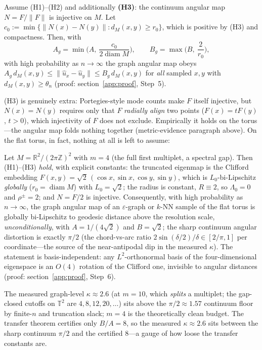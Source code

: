 \documentclass[review]{siamart220329}
\begin{document}
\begin{corollary}\label{cor:global}
Assume (H1)--(H2) and additionally \textbf{(H3)}: the continuum angular
map $N=F/\lVert F\rVert$ is injective on $M$. Let
$c_0:=\min\{\lVert N(x)-N(y)\rVert : d_M(x,y)\ge r_0\}$, which is positive by
(H3) and compactness. Then, with
\[
A_g=\min\Big(A,\ \frac{c_0}{2\operatorname{diam}M}\Big),\qquad
B_g=\max\Big(B,\ \frac{2}{r_0}\Big),
\]
with high probability as $n\to\infty$ the graph angular map obeys
$A_g\,d_M(x,y)\le\lVert\hat u_x-\hat u_y\rVert\le B_g\,d_M(x,y)$ for
\emph{all} sampled $x,y$ with $d_M(x,y)\ge\theta_n$
(proof: section~\ref{app:proof}, Step~5).
\end{corollary}

(H3) is genuinely extra: Portegies-style mode counts \cite{portegies2016}
make $F$ itself injective, but $N(x)=N(y)$ requires only that $F$ \emph{radially
align} two points ($F(x)=tF(y)$, $t>0$), which injectivity of $F$ does not
exclude. Empirically it holds on the torus---the angular map folds nothing
together (metric-evidence paragraph above). On the flat torus, in fact, nothing
at all is left to assume:

\begin{corollary}\label{cor:torus}
Let $M=\mathbb{R}^2/(2\pi\mathbb{Z})^2$ with $m=4$ (the full first
multiplet, a spectral gap). Then (H1)--(H3) \emph{hold}, with explicit
constants: the truncated eigenmap is the Clifford embedding
$F(x,y)=\sqrt2\,(\cos x,\sin x,\cos y,\sin y)$, which is $L_0$-bi-Lipschitz
\emph{globally} ($r_0=\operatorname{diam}M$) with $L_0=\sqrt2$; the radius is
constant, $R\equiv2$, so $\Lambda_0=0$ and $\rho^\pm=2$; and $N=F/2$ is
injective. Consequently, with high probability as $n\to\infty$, the graph
angular map of an $\varepsilon$-graph or $k$-NN sample of the flat torus is
globally bi-Lipschitz to geodesic distance above the resolution scale,
\emph{unconditionally}, with $A=1/(4\sqrt2)$ and $B=\sqrt2$; the sharp
continuum angular distortion is exactly $\pi/2$ (the chord-vs-arc ratio
$2\sin(\delta/2)/\delta\in[2/\pi,1]$ per coordinate---the source of the
near-antipodal dip in the measured $\kappa$). The statement is basis-independent: any
$L^2$-orthonormal basis of the four-dimensional eigenspace is an $O(4)$
rotation of the Clifford one, invisible to angular distances (proof:
section~\ref{app:proof}, Step~6).
\end{corollary}

The measured graph-level $\kappa\approx2.6$ (at $m{=}10$, which \emph{splits} a
multiplet; the gap-closed cutoffs on $\mathbb T^2$ are $4,8,12,20,\dots$) sits
above the $\pi/2\approx1.57$ continuum floor by finite-$n$ and truncation slack;
$m{=}4$ is the theoretically clean budget. The transfer theorem certifies only
$B/A=8$, so the measured $\kappa\approx2.6$ sits between the sharp continuum $\pi/2$
and the certified $8$---a gauge of how loose the transfer constants are.
\end{document}
